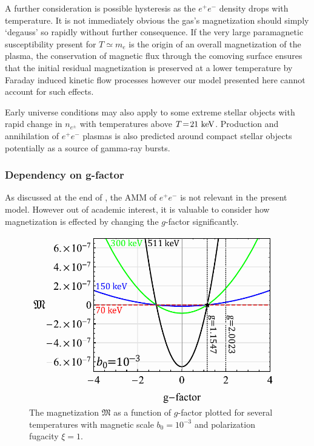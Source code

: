 A further consideration is possible hysteresis as the $e^{+}e^{-}$ density drops with temperature. It is not immediately obvious the gas's magnetization should simply `degauss' so rapidly without further consequence. If the very large paramagnetic susceptibility present for $T\simeq m_{e}$ is the origin of an overall magnetization of the plasma, the conservation of magnetic flux through the comoving surface ensures that the initial residual magnetization is preserved at a lower temperature by Faraday induced kinetic flow processes however our model presented here cannot account for such effects.

Early universe conditions may also apply to some extreme stellar objects with rapid change in $n_{e^{\pm}}$ with temperatures above $T\!=\!21\text{ keV}$. Production and annihilation of $e^{+}e^{-}$ plasmas is also predicted around compact stellar objects~\cite{Ruffini:2009hg,Ruffini:2012it} potentially as a source of gamma-ray bursts.

\subsubsection{Dependency on g-factor}
\label{sec:gfac}

\noindent As discussed at the end of , the AMM of $e^{+}e^{-}$ is not relevant in the present model. However out of academic interest, it is valuable to consider how magnetization is effected by changing the $g$-factor significantly.

\begin{figure}[ht]
 \centering
 \includegraphics[width=0.95\textwidth]{plots/chap04cosmo/thesis_gfac.pdf}
 \caption{The magnetization $\mathfrak M$ as a function of $g$-factor plotted for several temperatures with magnetic scale $b_{0}=10^{-3}$ and polarization fugacity $\xi=1$.}
 \label{fig:gfac} 
\end{figure}


